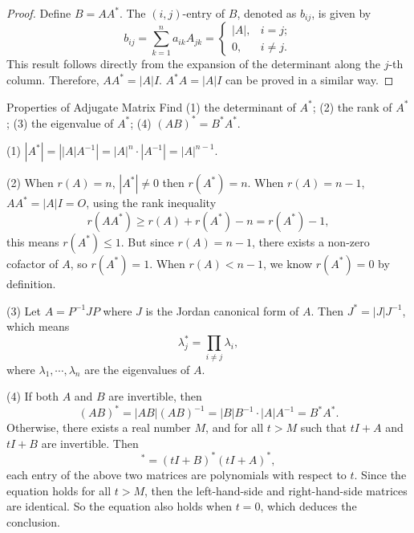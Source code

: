 \begin{proof}
  Define $B = AA^{\ast}$.
  The $(i,j)$-entry of $B$, denoted as $b_{ij}$, is given by 
  \begin{equation}
    b_{ij} = \sum\limits_{k = 1}^n a_{ik} A_{jk} =
    \begin{cases}
      |A|, & i = j;\\
      0, & i \neq j.
    \end{cases}
  \end{equation}
  This result follows directly from the expansion of the determinant along the
  $j$-th column.
  Therefore, $AA^{\ast} = |A|I$.
  $A^{\ast}A = |A|I$ can be proved in a similar way.
\end{proof}

\begin{example}{Properties of Adjugate Matrix}{}
  Find
  (1) the determinant of $A^{\ast}$;
  (2) the rank of $A^{\ast}$;
  (3) the eigenvalue of $A^{\ast}$;
  (4) $(AB)^{\ast} = B^{\ast}A^{\ast}$.
\end{example}

\begin{solution}
  (1) $|A^{\ast}| = \left| |A| A^{-1} \right| = |A|^n \cdot |A^{-1}| = |A|^{n-1}$.

  (2) When $r(A) = n$, $|A^{\ast}| \neq 0$ then $r(A^{\ast}) = n$.
  When $r(A) = n-1$, $AA^{\ast} = |A|I = O$, using the rank inequality
  \begin{equation}
    r(AA^{\ast}) \geq r(A) + r(A^{\ast}) - n = r(A^{\ast}) - 1,
  \end{equation}
  this means $r(A^{\ast}) \leq 1$.
  But since $r(A) = n-1$, there exists a non-zero cofactor of $A$,
  so $r(A^{\ast}) = 1$.
  When $r(A) < n-1$, we know $r(A^{\ast}) = 0$ by definition.

  (3) Let $A = P^{-1}JP$ where $J$ is the Jordan canonical form of $A$.
  Then $J^{\ast} = |J|J^{-1}$, which means
  \begin{equation}
    \lambda_j^{\ast} = \prod \limits_{i \neq j} \lambda_i,
  \end{equation}
  where $\lambda_1,\cdots,\lambda_n$ are the eigenvalues of $A$.

  (4) If both $A$ and $B$ are invertible, then
  \begin{equation}
    (AB)^{\ast} = |AB|(AB)^{-1} = |B|B^{-1}\cdot |A|A^{-1} = B^{\ast}A^{\ast}.
  \end{equation}
  Otherwise, there exists a real number $M$, and for all $t > M$ such that
  $tI + A$ and $t I + B$ are invertible. Then
  \begin{equation}
    [(tI + A)(tI + B)]^{\ast} = (tI + B)^{\ast}(tI + A)^{\ast},
  \end{equation}
  each entry of the above two matrices are polynomials with respect to $t$.
  Since the equation holds for all $t > M$, then the left-hand-side and
  right-hand-side matrices are identical.
  So the equation also holds when $t = 0$, which deduces the conclusion.
\end{solution}

